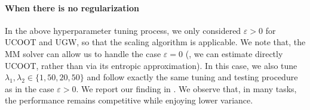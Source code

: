 \paragraph{When there is no regularization} In the above hyperparameter tuning process,
we only considered $\varepsilon > 0$ for UCOOT and UGW, so that the scaling algorithm
\citep{Chizat18b} is applicable. We note that,
the MM solver can allow us to handle the case $\varepsilon = 0$
(\ie, we can estimate directly UCOOT, rather than via its entropic approximation).
In this case, we also tune $\lambda_1, \lambda_2 \in \{ 1, 50, 20, 50\}$ and
follow exactly the same tuning and testing procedure as in the case $\varepsilon > 0$.
We report our finding in . We observe that, in many tasks,
the performance remains competitive while enjoying lower variance.
\newline
